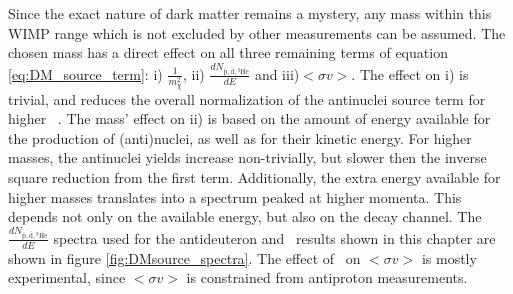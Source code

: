 
Since the exact nature of dark matter remains a mystery, any mass within this WIMP range which is not excluded by other measurements can be assumed. The chosen mass has a direct effect on all three remaining terms of equation \ref{eq:DM_source_term}: i) $\frac{1}{m_\chi^2}$, ii) $\frac{dN_{\mathrm{\bar{p}, \bar{d}, {^3\overline{He}}}}}{dE}$  and iii)$<\sigma v>$. The effect on i) is trivial, and reduces the overall normalization of the antinuclei source term for higher \dmm\ . The mass' effect on ii) is based on the amount of energy available for the production of (anti)nuclei, as well as for their kinetic energy. For higher masses, the antinuclei yields increase non-trivially, but slower then the inverse square reduction from the first term. Additionally, the extra energy available for higher masses translates into a spectrum peaked at higher momenta. This depends not only on the available energy, but also on the decay channel. The $\frac{dN_{\mathrm{\bar{p}, \bar{d}, {^3\overline{He}}}}}{dE}$ spectra used for the antideuteron and \ahe\ results shown in this chapter are shown in figure \ref{fig:DMsource_spectra}. The effect of \dmm\ on $<\sigma v>$ is mostly experimental, since $<\sigma v>$ is constrained from antiproton measurements. 

